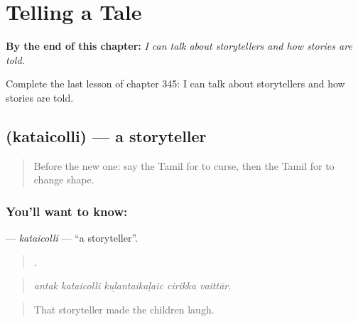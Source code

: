 
\chapter{Telling a Tale}
\label{ch:ta-telling-a-tale}

\begin{chapteropening}
\textbf{By the end of this chapter:} \emph{I can talk about storytellers and how stories are told.}

Complete the last lesson of chapter 345: I can talk about storytellers and how stories are told.
\end{chapteropening}

\section[\texorpdfstring{\ta{கதைசொல்லி} (kataicolli)}{கதைசொல்லி (kataicolli)}]{ (kataicolli) — a storyteller}

\label{lesson:TA-C345-kataicolli}



\begin{quote}
Before the new one: say the Tamil for to curse, then the Tamil for to change shape.
\end{quote}

\subsection*{You'll want to know: }
\textbf{} — \emph{kataicolli} — \textquotedblleft{}a storyteller\textquotedblright{}.

\begin{quote}
    .
\end{quote}

\begin{quote}
\emph{antak kataicolli kuḻantaikaḷaic cirikka vaittār.}
\end{quote}

\begin{quote}
That storyteller made the children laugh.
\end{quote}

